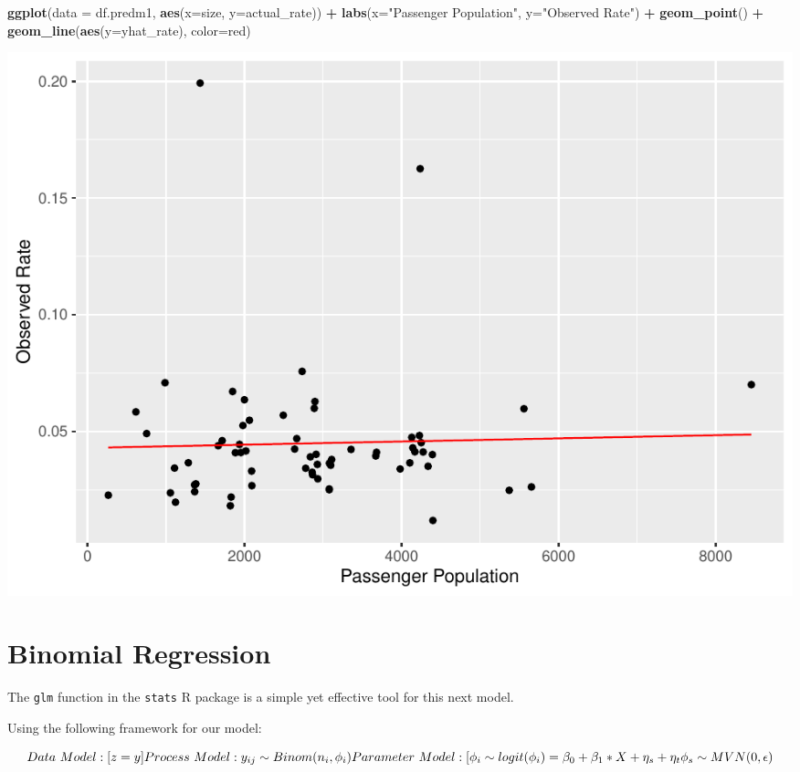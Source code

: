 \documentclass[
  11,
]{book}
\newenvironment{Shaded}{\begin{snugshade}}{\end{snugshade}}
\newcommand{\AttributeTok}[1]{\textcolor[rgb]{0.27,0.27,0.27}{#1}}
\newcommand{\FunctionTok}[1]{\textcolor[rgb]{0.27,0.27,0.27}{\textbf{#1}}}
\newcommand{\NormalTok}[1]{#1}
\newcommand{\SpecialCharTok}[1]{\textcolor[rgb]{0.43,0.43,0.43}{\textbf{#1}}}
\newcommand{\StringTok}[1]{\textcolor[rgb]{0.5,0.5,0.5}{#1}}
\begin{document}
\begin{Shaded}
\begin{Highlighting}[]
\FunctionTok{ggplot}\NormalTok{(}\AttributeTok{data =}\NormalTok{ df.predm1, }\FunctionTok{aes}\NormalTok{(}\AttributeTok{x=}\NormalTok{size, }\AttributeTok{y=}\NormalTok{actual\_rate)) }\SpecialCharTok{+} 
  \FunctionTok{labs}\NormalTok{(}\AttributeTok{x=}\StringTok{"Passenger Population"}\NormalTok{, }\AttributeTok{y=}\StringTok{"Observed Rate"}\NormalTok{) }\SpecialCharTok{+}
  \FunctionTok{geom\_point}\NormalTok{() }\SpecialCharTok{+}
  \FunctionTok{geom\_line}\NormalTok{(}\FunctionTok{aes}\NormalTok{(}\AttributeTok{y=}\NormalTok{yhat\_rate), }\AttributeTok{color=}\StringTok{\textquotesingle{}red\textquotesingle{}}\NormalTok{)}
\end{Highlighting}
\end{Shaded}

\includegraphics{_main_files/figure-latex/predm1_plot-1.pdf}

\hypertarget{binomial-regression}{%
\section*{Binomial Regression}\label{binomial-regression}}


The \texttt{glm} function in the \texttt{stats} R package is a simple yet effective tool for this next model.

Using the following framework for our model:

\begin{equation}
{Data \ Model}: [z=y]
\newline
{Process \ Model}: y_{ij} \sim Binom(n_i,\phi_i)
\newline
{Parameter \ Model}: [\phi_i \sim logit(\phi_i) = \beta_0 + \beta_1 * X + \eta_s + \eta_t
\newline
\phi_s \sim MVN(0,\epsilon)
\end{equation}
\end{document}
